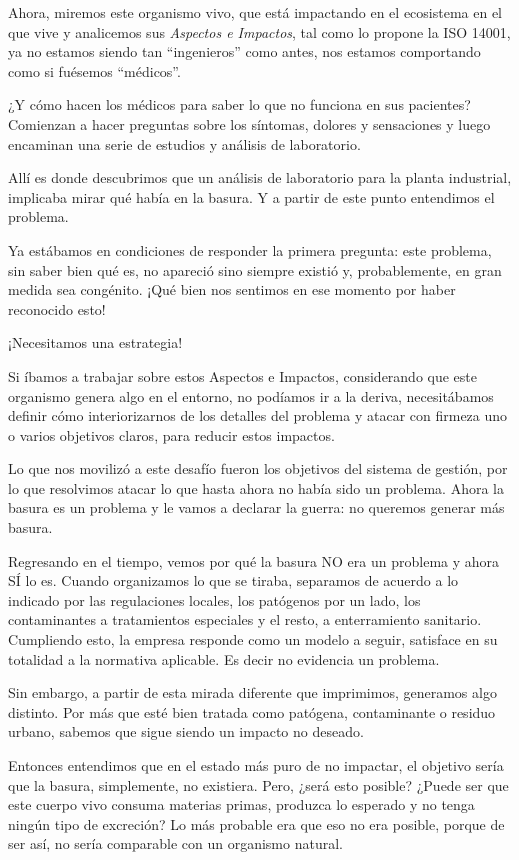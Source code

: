 \begin{fullwidth}
Ahora, miremos este organismo vivo, que está impactando en el ecosistema
en el que vive y analicemos sus \emph{Aspectos e Impactos}, tal como lo
propone la ISO 14001, ya no estamos siendo tan ``ingenieros'' como
antes, nos estamos comportando como si fuésemos ``médicos''.

¿Y cómo hacen los médicos para saber lo que no funciona en sus
pacientes? Comienzan a hacer preguntas sobre los síntomas, dolores y
sensaciones y luego encaminan una serie de estudios y análisis de
laboratorio.

Allí es donde descubrimos que un análisis de laboratorio para la planta
industrial, implicaba mirar qué había en la basura. Y a partir de este
punto entendimos el problema.

Ya estábamos en condiciones de responder la primera pregunta: este
problema, sin saber bien qué es, no apareció sino siempre existió y,
probablemente, en gran medida sea congénito. ¡Qué bien nos sentimos en
ese momento por haber reconocido esto!

¡Necesitamos una estrategia!

Si íbamos a trabajar sobre estos Aspectos e Impactos, considerando que
este organismo genera algo en el entorno, no podíamos ir a la deriva,
necesitábamos definir cómo interiorizarnos de los detalles del problema
y atacar con firmeza uno o varios objetivos claros, para reducir estos
impactos.

Lo que nos movilizó a este desafío fueron los objetivos del sistema de
gestión, por lo que resolvimos atacar lo que hasta ahora no había sido
un problema. Ahora la basura es un problema y le vamos a declarar la
guerra: no queremos generar más basura.

Regresando en el tiempo, vemos por qué la basura NO era un problema y
ahora SÍ lo es. Cuando organizamos lo que se tiraba, separamos de
acuerdo a lo indicado por las regulaciones locales, los patógenos por un
lado, los contaminantes a tratamientos especiales y el resto, a
enterramiento sanitario. Cumpliendo esto, la empresa responde como un
modelo a seguir, satisface en su totalidad a la normativa aplicable. Es
decir no evidencia un problema.

Sin embargo, a partir de esta mirada diferente que imprimimos, generamos
algo distinto. Por más que esté bien tratada como patógena, contaminante
o residuo urbano, sabemos que sigue siendo un impacto no deseado.

Entonces entendimos que en el estado más puro de no impactar, el
objetivo sería que la basura, simplemente, no existiera. Pero, ¿será
esto posible? ¿Puede ser que este cuerpo vivo consuma materias primas,
produzca lo esperado y no tenga ningún tipo de excreción? Lo más
probable era que eso no era posible, porque de ser así, no sería
comparable con un organismo natural.


\end{fullwidth}

